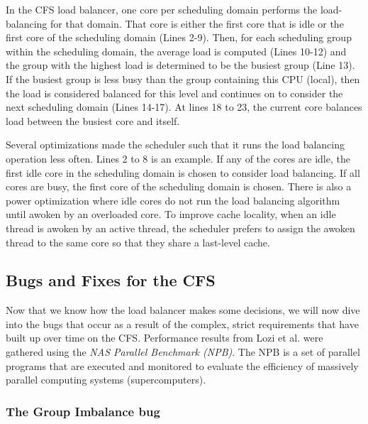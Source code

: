 \documentclass{sig-alternate}
\begin{document}
In the CFS load balancer, one core per scheduling domain performs the load-balancing for that domain. That core is either the first core that is idle or the first core of the scheduling domain (Lines 2-9). Then, for each scheduling group within the scheduling domain, the average load is computed (Lines 10-12) and the group with the highest load is determined to be the busiest group (Line 13). If the busiest group is less busy than the group containing this CPU (local), then the load is considered balanced for this level and continues on to consider the next scheduling domain (Lines 14-17). At lines 18 to 23, the current core balances load between the busiest core and itself.~\cite{Lozi:2016}

Several optimizations made the scheduler such that it runs the load balancing operation less often. Lines 2 to 8 is an example. If any of the cores are idle, the first idle core in the scheduling domain is chosen to consider load balancing. If all cores are busy, the first core of the scheduling domain is chosen. There is also a power optimization where idle cores do not run the load balancing algorithm until awoken by an overloaded core. To improve cache locality, when an idle thread is awoken by an active thread, the scheduler prefers to assign the awoken thread to the same core so that they share a last-level cache.~\cite{Lozi:2016}

\subsection{Bugs and Fixes for the CFS}
\label{sec:cfsbugs}

Now that we know how the load balancer makes some decisions, we will now dive into the bugs that occur as a result of the complex, strict requirements that have built up over time on the CFS. Performance results from Lozi et al. were gathered using the \emph{NAS Parallel Benchmark (NPB)}. The NPB is a set of parallel programs that are executed and monitored to evaluate the efficiency of massively parallel computing systems (supercomputers).

\subsubsection{The Group Imbalance bug}
\label{sec:cfsfault_grpimbalance}
\end{document}
